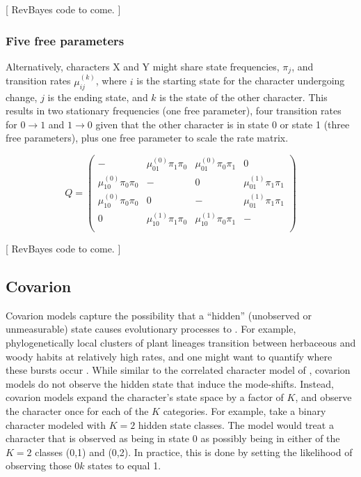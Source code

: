 [ RevBayes code to come. ]

\subsubsection{Five free parameters}

Alternatively, characters X and Y might share state frequencies, $\pi_j$, and transition rates $\mu_{ij}^{(k)}$, where $i$ is the starting state for the character undergoing change, $j$ is the ending state, and $k$ is the state of the other character.
This results in two stationary frequencies (one free parameter), four transition rates for $0 \rightarrow 1$ and $1 \rightarrow 0$ given that the other character is in state 0 or state 1 (three free parameters), plus one free parameter to scale the rate matrix.

\begin{equation*}
Q = \begin{pmatrix}
- & \mu_{01}^{(0)} \pi_1 \pi_0 & \mu_{01}^{(0)} \pi_0 \pi_1 & 0 \\
\mu_{10}^{(0)} \pi_0 \pi_0 & -   & 0 & \mu_{01}^{(1)} \pi_1 \pi_1 \\
\mu_{10}^{(0)} \pi_0 \pi_0 & 0   & - & \mu_{01}^{(1)} \pi_1 \pi_1 \\
0 & \mu_{10}^{(1)} \pi_1 \pi_0 & \mu_{10}^{(1)} \pi_0 \pi_1 & - \\
\end{pmatrix}
\end{equation*}

[ RevBayes code to come. ]

\subsection{Covarion}

Covarion models \citep{tuffley98} capture the possibility that a ``hidden'' (unobserved or unmeasurable) state causes evolutionary processes to .
For example, phylogenetically local clusters of plant lineages transition between herbaceous and woody habits at relatively high rates, and one might want to quantify where these bursts occur \citep{beaulieu15}.
While similar to the correlated character model of \citet{pagel94}, covarion models do not observe the hidden state that induce the mode-shifts.
Instead, covarion models expand the character's state space by a factor of $K$, and observe the character once for each of the $K$ categories.
For example, take a binary character modeled with $K=2$ hidden state classes.
The model would treat a character that is observed as being in state 0 as possibly being in either of the $K=2$ classes (0,1) and (0,2).
In practice, this is done by setting the likelihood of observing those $0k$ states to equal 1.

